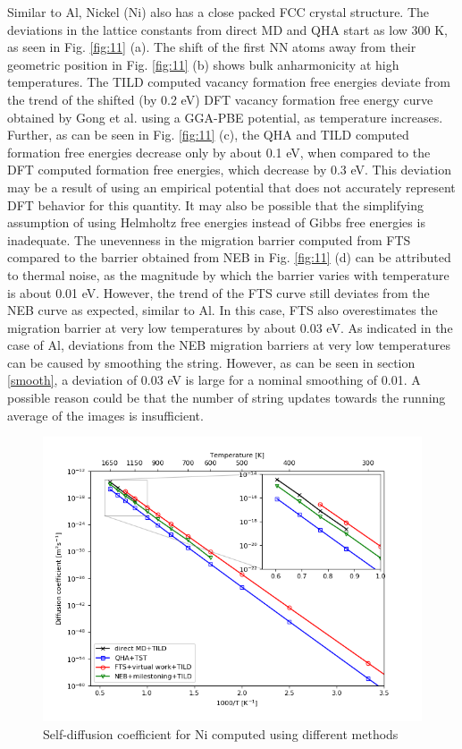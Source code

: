 \documentclass{article}
\begin{document}
Similar to Al, Nickel (Ni) also has a close packed FCC crystal structure. The deviations in the lattice constants from direct MD and QHA start as low 300 K, as seen in Fig. \ref{fig:11} (a). The shift of the first NN atoms away from their geometric position in Fig. \ref{fig:11} (b) shows bulk anharmonicity at high temperatures. The TILD computed vacancy formation free energies deviate from the trend of the shifted (by 0.2 eV) DFT vacancy formation free energy curve obtained by Gong et al. \cite{Gong2018} using a GGA-PBE potential, as temperature increases. Further, as can be seen in Fig. \ref{fig:11} (c), the QHA and TILD computed formation free energies decrease only by about 0.1 eV, when compared to the DFT computed formation free energies, which decrease by 0.3 eV. This deviation may be a result of using an empirical potential that does not accurately represent DFT behavior for this quantity. It may also be possible that the simplifying assumption of using Helmholtz free energies instead of Gibbs free energies is inadequate. The unevenness in the migration barrier computed from FTS compared to the barrier obtained from NEB in Fig. \ref{fig:11} (d) can be attributed to thermal noise, as the magnitude by which the barrier varies with temperature is about 0.01 eV. However, the trend of the FTS curve still deviates from the NEB curve as expected, similar to Al. In this case, FTS also overestimates the migration barrier at very low temperatures by about 0.03 eV. As indicated in the case of Al, deviations from the NEB migration barriers at very low temperatures can be caused by smoothing the string. However, as can be seen in section \ref{smooth}, a deviation of 0.03 eV is large for a nominal smoothing of 0.01. A possible reason could be that the number of string updates towards the running average of the images is insufficient.

\begin{figure}[htp]
\centering
\includegraphics[scale=0.65]{ni_self_diffusion}
\caption{Self-diffusion coefficient for Ni computed using different methods}
\label{fig:12}
\end{figure}
\end{document}
